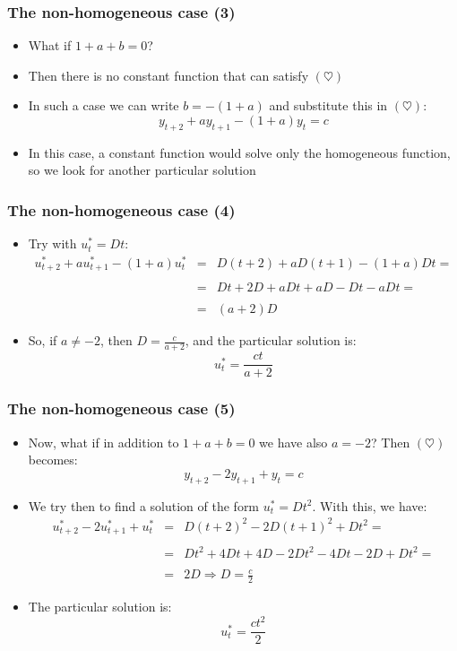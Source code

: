 \documentclass[10pt,usenames,dvipsnames]{beamer}
\theoremstyle{definition}
\begin{document}
\begin{frame}[fragile]
\frametitle{The non-homogeneous case (3)}
\begin{itemize}
	\item What if $1 + a + b = 0$?
	\item Then there is no constant function that can satisfy $(\heartsuit)$
	\item In such a case we can write $b = -(1 + a)$ and substitute this in $(\heartsuit)$:
	\[
		y_{t+2} + a y_{t+1} - (1 + a) y_{t} = c
	\]
	\item In this case, a constant function would solve only the homogeneous function, so we look for another particular solution
\end{itemize}
\end{frame}

\begin{frame}[fragile]
\frametitle{The non-homogeneous case (4)}
\begin{itemize}
	\item Try with $u_{t}^{*} = Dt$:
	\[
	\begin{array}{lcl}
		u_{t+2}^{*} + a u_{t+1}^{*} - (1 + a) u_{t}^{*} & = & D(t+2) + a D(t+1) - (1 + a)Dt = \\
		\quad\\
		& = & Dt + 2D + aDt + aD - Dt - aDt = \\
		\quad\\
		& = & (a + 2)D
	\end{array}
	\]
	\item So, if $a \neq -2$, then $\displaystyle D = \frac{c}{a + 2}$, and the particular solution is:
	\[
		u_{t}^{*} = \frac{c t}{a + 2}
	\]
	
\end{itemize}
\end{frame}

\begin{frame}[fragile]
\frametitle{The non-homogeneous case (5)}
\begin{itemize}
	\item Now, what if in addition to $1 + a + b = 0$ we have also $a = -2$? Then $(\heartsuit)$ becomes:
	\[
		y_{t+2} - 2y_{t+1} + y_{t} = c
	\]
	\item We try then to find a solution of the form $u_{t}^{*} = Dt^{2}$. With this, we have:
	\[
	\begin{array}{lcl}
		u_{t+2}^{*} - 2 u_{t+1}^{*} + u_{t}^{*} & = & D(t+2)^{2} - 2 D(t+1)^{2} + Dt^{2} = \\
		\quad\\
		& = & Dt^{2} + 4Dt + 4D - 2Dt^{2} - 4Dt - 2D + Dt^{2} = \\
		\quad\\
		& = & \displaystyle 2D \Rightarrow D = \frac{c}{2}
	\end{array}
	\]
	\item The particular solution is:
	\[
		u_{t}^{*} = \frac{c t^{2}}{2}
	\]
\end{itemize}
\end{frame}
\end{document}
